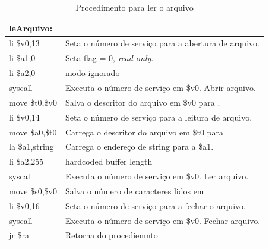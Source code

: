 \documentclass[12pt,a4paper]{article}
\numberwithin{figure}{subsection}
\numberwithin{table}{subsection}
\begin{document}
\begin{table}[H]
	\renewcommand{\arraystretch}{1.2}
	\centering
	\caption*{Procedimento para ler o arquivo}
	\label{q2cod:lefile}
	\begin{tabular}{>{\ttfamily}p{4cm} p{11cm}}
		\toprule
		leArquivo:       & \\
		\midrule[0.01cm]
		li \$v0,13       & Seta o número de serviço para a abertura de arquivo.  \\
		li \$a1,0        & Seta flag = 0, \textit{read-only}. \\
		li \$a2,0        & modo ignorado \\
		syscall          & Executa o número de serviço em {\ttfamily \$v0}. Abrir arquivo. \\
		move \$t0,\$v0   & Salva o descritor do arquivo em {\ttfamily \$v0} para \ttfamily{\$t0}. \\
		\midrule[0.01cm]
		li \$v0,14       & Seta o número de serviço para a leitura de arquivo. \\
		move \$a0,\$t0   & Carrega o descritor do arquivo em {\ttfamily \$t0} para \ttfamily{\$a0}. \\
		la \$a1,string   & Carrega o endereço de {\ttfamily string} para a {\ttfamily \$a1}. \\
		li \$a2,255      & hardcoded buffer length \\
		syscall          & Executa o número de serviço em {\ttfamily \$v0}. Ler arquivo. \\
		move \$s0,\$v0   & Salva o número de caracteres lidos em \ttfamily{\$s0} \\
		\midrule[0.01cm]
		li \$v0,16       & Seta o número de serviço para a fechar o arquivo. \\
		syscall          & Executa o número de serviço em {\ttfamily \$v0}. Fechar arquivo. \\
		\midrule[0.01cm]
		jr \$ra          & Retorna do procediemnto \\
		\bottomrule
	\end{tabular}
\end{table}
\end{document}
